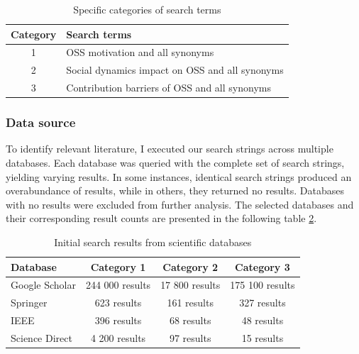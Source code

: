 \begin{table}[ht]
    \centering
    \begin{tabular}{ | c | l | }
        \hline
         Category & Search terms \\ \hline
          1 & OSS motivation and all synonyms \\ \hline
          2 & Social dynamics impact on OSS and all synonyms \\  \hline
          3 & Contribution barriers of OSS and all synonyms\\  \hline
    \end{tabular}
    \caption{Specific categories of search terms}
    \label{tab:categoriesSearchTerms}
\end{table}



\subsubsection{Data source}

To identify relevant literature, I executed our search strings across multiple databases. Each database was queried with the complete set of search strings, yielding varying results. In some instances, identical search strings produced an overabundance of results, while in others, they returned no results. Databases with no results were excluded from further analysis. The selected databases and their corresponding result counts are presented in the following table \ref{tab:initialSearch}. 


\begin{table}[ht]
    \centering
    \begin{tabular}{ | l | c | c | c |}
        \hline
      Database   & Category 1 & Category 2 & Category 3 \\ \hline
      Google Scholar   &  244 000 results & 17 800 results  & 175 100 results \\ \hline
        Springer & 623 results &   161 results &  327 results \\ \hline
      IEEE   & 396 results & 68 results & 48 results \\ \hline
      Science Direct & 4 200 results & 97 results & 15 results \\ \hline
      
    \end{tabular}
    \caption{Initial search results from scientific databases}
    \label{tab:initialSearch}
\end{table}



